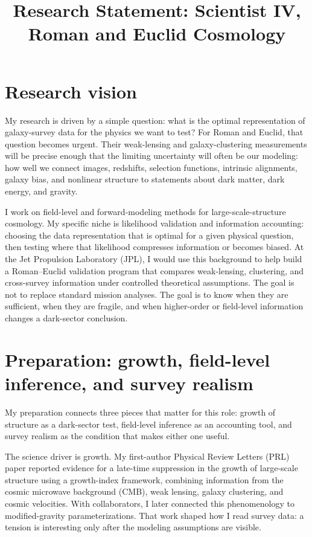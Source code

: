 \documentclass[11pt,letterpaper,sans]{moderncv}
\title{Research Statement: Scientist IV, Roman and Euclid Cosmology}
\begin{document}
\makecvtitle
\vspace{-1.2em}

\section{Research vision}
My research is driven by a simple question: what is the optimal representation of galaxy-survey data for the physics we want to test? For Roman and Euclid, that question becomes urgent. Their weak-lensing and galaxy-clustering measurements will be precise enough that the limiting uncertainty will often be our modeling: how well we connect images, redshifts, selection functions, intrinsic alignments, galaxy bias, and nonlinear structure to statements about dark matter, dark energy, and gravity.

I work on field-level and forward-modeling methods for large-scale-structure cosmology. My specific niche is likelihood validation and information accounting: choosing the data representation that is optimal for a given physical question, then testing where that likelihood compresses information or becomes biased. At the Jet Propulsion Laboratory (JPL), I would use this background to help build a Roman--Euclid validation program that compares weak-lensing, clustering, and cross-survey information under controlled theoretical assumptions. The goal is not to replace standard mission analyses. The goal is to know when they are sufficient, when they are fragile, and when higher-order or field-level information changes a dark-sector conclusion.

\section{Preparation: growth, field-level inference, and survey realism}
My preparation connects three pieces that matter for this role: growth of structure as a dark-sector test, field-level inference as an accounting tool, and survey realism as the condition that makes either one useful.

The science driver is growth. My first-author Physical Review Letters (PRL) paper reported evidence for a late-time suppression in the growth of large-scale structure using a growth-index framework, combining information from the cosmic microwave background (CMB), weak lensing, galaxy clustering, and cosmic velocities. With collaborators, I later connected this phenomenology to modified-gravity parameterizations. That work shaped how I read survey data: a tension is interesting only after the modeling assumptions are visible.
\end{document}
